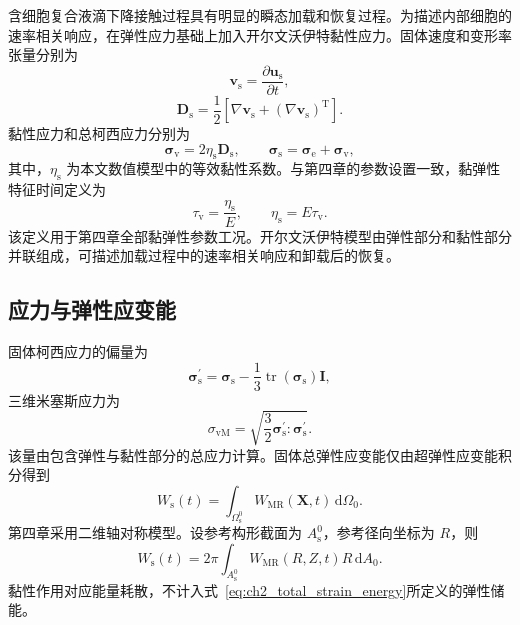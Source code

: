 含细胞复合液滴下降接触过程具有明显的瞬态加载和恢复过程。为描述内部细胞的速率相关响应，在弹性应力基础上加入开尔文沃伊特黏性应力。固体速度和变形率张量分别为
\begin{equation}
\boldsymbol{v}_{\mathrm s}
=
\frac{\partial\boldsymbol{u}_{\mathrm s}}{\partial t},
\label{eq:ch2_solid_velocity}
\end{equation}
\begin{equation}
\boldsymbol{D}_{\mathrm s}
=
\frac{1}{2}
\left[
\nabla\boldsymbol{v}_{\mathrm s}
+
\left(\nabla\boldsymbol{v}_{\mathrm s}\right)^{\mathrm T}
\right].
\label{eq:ch2_solid_rate}
\end{equation}
黏性应力和总柯西应力分别为
\begin{equation}
\boldsymbol{\sigma}_{\mathrm v}
=
2\eta_{\mathrm s}\boldsymbol{D}_{\mathrm s},
\qquad
\boldsymbol{\sigma}_{\mathrm s}
=
\boldsymbol{\sigma}_{\mathrm e}
+
\boldsymbol{\sigma}_{\mathrm v},
\label{eq:ch2_kelvin_voigt_3d}
\end{equation}
其中，$\eta_{\mathrm s}$ 为本文数值模型中的等效黏性系数。与第四章的参数设置一致，黏弹性特征时间定义为
\begin{equation}
\tau_{\mathrm v}
=
\frac{\eta_{\mathrm s}}{E},
\qquad
\eta_{\mathrm s}=E\tau_{\mathrm v}.
\label{eq:ch2_kelvin_voigt_time}
\end{equation}
该定义用于第四章全部黏弹性参数工况。开尔文沃伊特模型由弹性部分和黏性部分并联组成，可描述加载过程中的速率相关响应和卸载后的恢复\cite{christensen1982theory,lakes1998viscoelastic}。

\subsection{应力与弹性应变能}

固体柯西应力的偏量为
\begin{equation}
\boldsymbol{\sigma}_{\mathrm s}^{\prime}
=
\boldsymbol{\sigma}_{\mathrm s}
-
\frac{1}{3}
\operatorname{tr}\left(\boldsymbol{\sigma}_{\mathrm s}\right)
\boldsymbol{I},
\label{eq:ch2_deviatoric_stress}
\end{equation}
三维米塞斯应力为
\begin{equation}
\sigma_{\mathrm{vM}}
=
\sqrt{
\frac{3}{2}
\boldsymbol{\sigma}_{\mathrm s}^{\prime}:\boldsymbol{\sigma}_{\mathrm s}^{\prime}}
.
\label{eq:ch2_von_mises}
\end{equation}
该量由包含弹性与黏性部分的总应力计算。固体总弹性应变能仅由超弹性应变能积分得到
\begin{equation}
W_{\mathrm s}(t)
=
\int_{\Omega_{\mathrm s}^0}
W_{\mathrm{MR}}(\boldsymbol{X},t)
\,\mathrm d\Omega_0.
\label{eq:ch2_total_strain_energy}
\end{equation}
第四章采用二维轴对称模型。设参考构形截面为 $A_{\mathrm s}^0$，参考径向坐标为 $R$，则
\begin{equation}
W_{\mathrm s}(t)
=
2\pi
\int_{A_{\mathrm s}^0}
W_{\mathrm{MR}}(R,Z,t)R
\,\mathrm dA_0.
\label{eq:ch2_axisymmetric_strain_energy}
\end{equation}
黏性作用对应能量耗散，不计入式~\eqref{eq:ch2_total_strain_energy}所定义的弹性储能。

